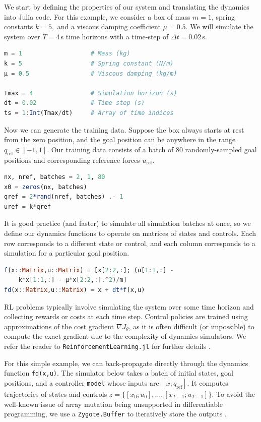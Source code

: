 We start by defining the properties of our system and translating the dynamics into Julia code. For this example, we consider a box of mass $m=1$, spring constants $k=5,$ and a viscous damping coefficient $\mu = 0.5$. We will simulate the system over $T = 4$\,s time horizons with a time-step of $\Delta t = 0.02$\,s.

\begin{lstlisting}[language = Julia]
m = 1                   # Mass (kg)
k = 5                   # Spring constant (N/m)
μ = 0.5                 # Viscous damping (kg/m)

Tmax = 4                # Simulation horizon (s)
dt = 0.02               # Time step (s)
ts = 1:Int(Tmax/dt)     # Array of time indices
\end{lstlisting}

Now we can generate the training data. Suppose the box always starts at rest from the zero position, and the goal position can be anywhere in the range $q_\mathrm{ref} \in [-1,1]$. Our training data consists of a batch of 80 randomly-sampled goal positions and corresponding reference forces $u_\mathrm{ref}$.
\begin{lstlisting}[language = Julia]
nx, nref, batches = 2, 1, 80
x0 = zeros(nx, batches)
qref = 2*rand(nref, batches) .- 1
uref = k*qref
\end{lstlisting}

It is good practice (and faster) to simulate all simulation batches at once, so we define our dynamics functions to operate on matrices of states and controls. Each row corresponds to a different state or control, and each column corresponds to a simulation for a particular goal position.
\begin{lstlisting}[language = Julia]
f(x::Matrix,u::Matrix) = [x[2:2,:]; (u[1:1,:] - 
    k*x[1:1,:] - μ*x[2:2,:].^2)/m]
fd(x::Matrix,u::Matrix) = x + dt*f(x,u)
\end{lstlisting}

RL problems typically involve simulating the system over some time horizon and collecting rewards or costs at each time step. Control policies are trained using approximations of the cost gradient $\nabla J_\theta$, as it is often difficult (or impossible) to compute the exact gradient due to the complexity of dynamics simulators. We refer the reader to \verb|ReinforcementLearning.jl| for further details \cite{Tian++2020}.

For this simple example, we can back-propagate directly through the dynamics function \verb|fd(x,u)|. The simulator below takes a batch of initial states, goal positions, and a controller \verb|model| whose inputs are $[x; q_\mathrm{ref}]$. It computes trajectories of states and controls $z = \{[x_0;u_0], \ldots, [x_{T-1};u_{T-1}]\}$. To avoid the well-known issue of array mutation being unsupported in differentiable programming, we use a \verb|Zygote.Buffer| to iteratively store the outputs \cite{Innes2018b}.

